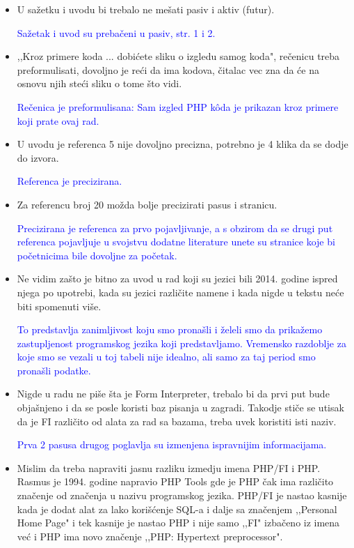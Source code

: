\documentclass[a4paper]{report}
\newcommand{\odgovor}[1]{\textcolor{blue}{#1}}
\begin{document}
\begin{itemize}
\item  U sažetku i uvodu bi trebalo ne mešati pasiv i aktiv (futur).

\odgovor{Sažetak i uvod su prebačeni u pasiv, str. 1 i 2.}

\item  ,,Kroz primere koda ... dobićete sliku o izgledu samog koda", rečenicu treba preformulisati, dovoljno je reći da ima kodova, čitalac vec zna da će na osnovu njih steći sliku o tome što vidi.

\odgovor{Rečenica je preformulisana: Sam izgled PHP k\^{o}da je prikazan kroz primere koji prate ovaj rad.}

\item U uvodu je referenca 5 nije dovoljno precizna, potrebno je 4 klika da se dodje do izvora.

\odgovor{Referenca je precizirana.}

\item Za referencu broj 20 možda bolje precizirati pasus i stranicu.

\odgovor{Precizirana je referenca za prvo pojavljivanje, a s obzirom da se drugi put referenca pojavljuje u svojstvu dodatne literature unete su stranice koje bi početnicima bile dovoljne za početak.}

\item Ne vidim zašto je bitno za uvod u rad koji su jezici bili 2014. godine ispred njega po upotrebi, kada su jezici različite namene i kada nigde u tekstu neće biti spomenuti više.

\odgovor{To predstavlja zanimljivost koju smo pronašli i želeli smo da prikažemo zastupljenost programskog jezika koji predstavljamo.
Vremensko razdoblje za koje smo se vezali u toj tabeli nije idealno, ali samo za taj period smo pronašli podatke.}

\item Nigde u radu ne piše šta je Form Interpreter, trebalo bi da prvi put bude objašnjeno i da se posle koristi baz pisanja u zagradi. Takodje stiče se utisak da je FI različito od alata za rad sa bazama, treba uvek koristiti isti naziv.

\odgovor{Prva 2 pasusa drugog poglavlja su izmenjena ispravnijim informacijama.}

\item Mislim da treba napraviti jasnu razliku izmedju imena PHP/FI i PHP. Rasmus je 1994. godine napravio PHP Tools gde je PHP čak ima različito značenje od značenja u nazivu programskog jezika. PHP/FI je nastao kasnije kada je dodat alat za lako korišćenje SQL-a i dalje sa značenjem ,,Personal Home Page" i tek kasnije je nastao PHP i nije samo ,,FI" izbačeno iz imena već i PHP ima novo značenje ,,PHP: Hypertext preprocessor". 


\end{itemize}
\end{document}
